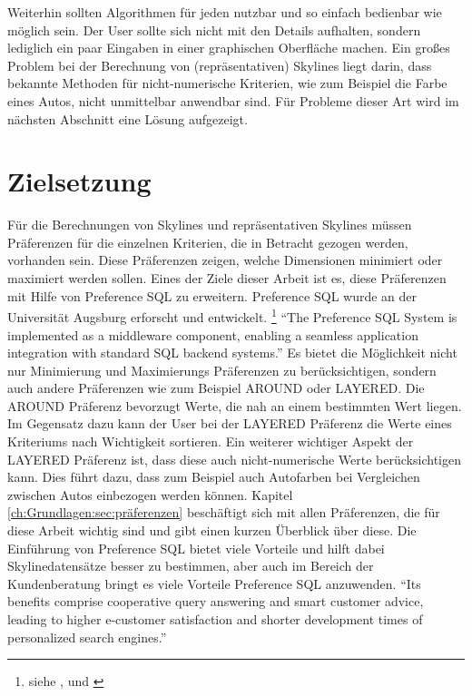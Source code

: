Weiterhin sollten Algorithmen für jeden nutzbar und so einfach bedienbar wie möglich sein. Der User sollte sich nicht mit den Details aufhalten, sondern lediglich ein paar Eingaben in einer graphischen Oberfläche machen. 
Ein großes Problem bei der Berechnung von (repräsentativen) Skylines liegt darin, dass bekannte Methoden für nicht-numerische Kriterien, wie zum Beispiel die Farbe eines Autos, nicht unmittelbar anwendbar sind. Für Probleme dieser Art wird im nächsten Abschnitt eine Lösung aufgezeigt.
\section{Zielsetzung}
\label{ch:Einleitung:sec:Zielsetzung}
Für die Berechnungen von Skylines und repräsentativen Skylines müssen Präferenzen für die einzelnen Kriterien, die in Betracht gezogen werden, vorhanden sein. Diese Präferenzen zeigen, welche Dimensionen minimiert oder maximiert werden sollen.
Eines der Ziele dieser Arbeit ist es, diese Präferenzen mit Hilfe von Preference SQL zu erweitern. Preference SQL wurde an der Universität Augsburg erforscht und entwickelt. \footnote{siehe \cite{kiessling2011preference}, \cite{kiessling2002foundations} und \cite{kiessling2002preference}}
\enquote{The Preference SQL System is implemented as a middleware component, enabling a seamless application integration with standard SQL backend systems.} \cite[p. 1]{kiessling2011preference}
Es bietet die Möglichkeit nicht nur Minimierung und Maximierungs Präferenzen zu berücksichtigen, sondern auch andere Präferenzen wie zum Beispiel AROUND oder LAYERED. Die AROUND Präferenz bevorzugt Werte, die nah an einem bestimmten Wert liegen. Im Gegensatz dazu kann der User bei der LAYERED Präferenz die Werte eines Kriteriums nach Wichtigkeit sortieren. Ein weiterer wichtiger Aspekt der LAYERED Präferenz ist, dass diese auch nicht-numerische Werte berücksichtigen kann. Dies führt dazu, dass zum Beispiel auch Autofarben bei Vergleichen zwischen Autos einbezogen werden können. Kapitel \ref{ch:Grundlagen:sec:präferenzen} beschäftigt sich mit allen Präferenzen, die für diese Arbeit wichtig sind und gibt einen kurzen Überblick über diese.
Die Einführung von Preference SQL bietet viele Vorteile und hilft dabei Skylinedatensätze besser zu bestimmen, aber auch im Bereich der Kundenberatung bringt es viele Vorteile Preference SQL anzuwenden.
\enquote{Its benefits comprise cooperative query answering and smart customer advice, leading to higher e-customer satisfaction and shorter development times of personalized search engines.}\cite[p. 1]{kiessling2002preference}

